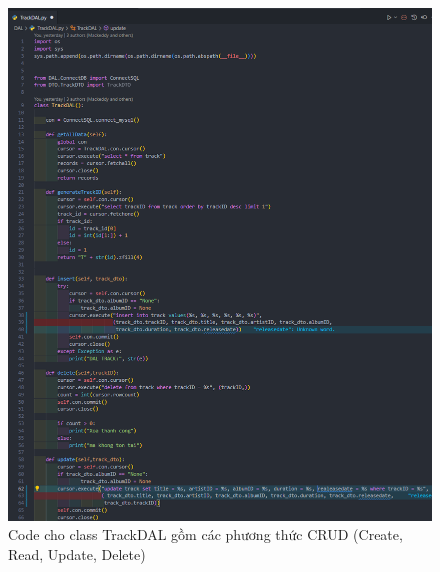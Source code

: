 \documentclass[a4paper]{article}
\begin{document}
\clearpage
\newpage
\begin{figure}[h]
	\centering
	\includegraphics[width=\textwidth]{images/TrackDAL.png}
	\caption{Code cho class TrackDAL gồm các phương thức CRUD (Create, Read, Update, Delete)}
\end{figure}
\clearpage
\newpage
\end{document}

